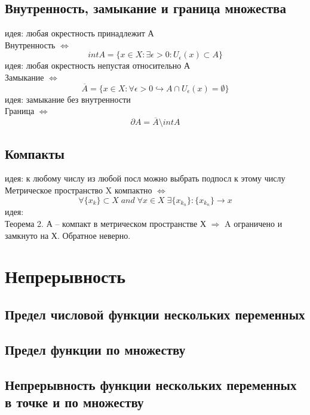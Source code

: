 \documentclass{article}
\begin{document}
\subsection{Внутренность, замыкание и граница множества}
идея: любая окрестность принадлежит А \\
Внутренность $\Leftrightarrow$
\begin{equation*}
    int A = \{ x \in X: \exists \epsilon > 0: U_{\epsilon} (x) \subset A \}
\end{equation*}
идея: любая окрестность непустая относительно А \\
Замыкание $\Leftrightarrow$
\begin{equation*}
    \overline{A} = \{ x \in X: \forall \epsilon>0 \hookrightarrow A \cap U_\epsilon (x) = \emptyset \}
\end{equation*}
идея: замыкание без внутренности \\
Граница $\Leftrightarrow$
\begin{equation*}
    \partial A = \overline{A} \setminus int A
\end{equation*}
\subsection{Компакты}
идея: к любому числу из любой посл можно выбрать подпосл к этому числу \\
Метрическое пространство X компактно $\Leftrightarrow$
\begin{equation*}
    \forall \{ x_k \} \subset X \; and \; \forall x \in X \; \exists \{ x_{k_n} \}: \{ x_{k_n} \} \rightarrow x
\end{equation*}
идея: \\
Теорема 2. А -- компакт в метрическом пространстве Х $\Rightarrow$ A ограничено и замкнуто на Х. Обратное неверно.


\newpage
\section{Непрерывность}
\subsection{Предел числовой функции нескольких переменных}
\subsection{Предел функции по множеству}
\subsection{Непрерывность функции нескольких переменных в точке и по множеству}
\end{document}
